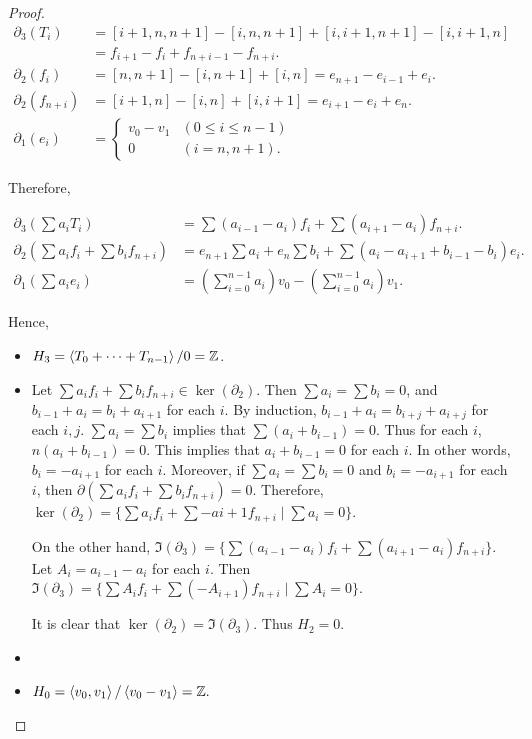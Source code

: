 \documentclass[12pt, psamsfonts]{amsart}
\theoremstyle{definition}
\theoremstyle{remark}
\numberwithin{equation}{section}
\begin{document}
\begin{proof}
  \begin{align*}
    \partial_3(T_i)
      &= [i + 1, n, n + 1] - [i, n, n + 1] + [i, i + 1, n + 1] - [i, i + 1, n] \\
      &= f_{i + 1} - f_i + f_{n + i - 1} - f_{n + i}. \\
    \partial_2(f_i)
      &= [n, n + 1] - [i, n + 1] + [i, n] = e_{n + 1} - e_{i - 1} + e_i. \\
    \partial_2(f_{n + i})
      &= [i + 1, n] - [i, n] + [i, i + 1] = e_{i + 1} - e_{i} + e_n. \\
    \partial_1(e_i) &= \begin{cases}
      v_0 - v_1 & (0 \leq i \leq n - 1) \\
      0 & (i = n, n + 1).
    \end{cases} 
  \end{align*}

  Therefore,

  \begin{align*}
    \partial_3(\sum a_iT_i) &= \sum (a_{i - 1} - a_i)f_i + \sum (a_{i + 1} - a_i) f_{n + i}. \\
    \partial_2(\sum a_if_i + \sum b_if_{n + i}) &= e_{n + 1}\sum a_i + e_n\sum b_i + \sum (a_i - a_{i + 1} + b_{i - 1} - b_i) e_i.\\
    \partial_1(\sum a_i e_i) &= (\sum_{i=0}^{n-1} a_i) v_0 - (\sum_{i=0}^{n-1} a_i) v_1.
  \end{align*}

  Hence,

  \begin{itemize}
    \item
      $H_3 = \ev{ T_0 + \cdots + T_{n - 1} } / 0 = \mathbb{Z}$.
    \item
      Let $\sum a_if_i + \sum b_if_{n + i} \in \ker(\partial_2)$.
      Then $\sum a_i = \sum b_i = 0$, and $b_{i - 1} + a_i = b_i + a_{i + 1}$ for each $i$.
      By induction, $b_{i - 1} + a_i = b_{i + j} + a_{i + j}$ for each $i, j$.
      $\sum a_i = \sum b_i$ implies that $\sum (a_i + b_{i - 1}) = 0$.
      Thus for each $i$, $n(a_i + b_{i - 1}) = 0$.
      This implies that $a_i + b_{i - 1} = 0$ for each $i$.
      In other words, $b_i = -a_{i + 1}$ for each $i$.
      Moreover, if $\sum a_i = \sum b_i = 0$ and $b_i = -a_{i + 1}$ for each $i$, then $\partial(\sum a_if_i + \sum b_if_{n + i}) = 0$.
      Therefore, $\ker(\partial_2) = \{ \sum a_if_i + \sum -a{i + 1}f_{n + i} \mid \sum a_i = 0 \}$.

      On the other hand, $\Im(\partial_3) = \{ \sum (a_{i - 1} - a_i) f_i + \sum (a_{i + 1} - a_i) f_{n + i} \}$.
      Let $A_i = a_{i - 1} - a_i$ for each $i$.
      Then $\Im(\partial_3) = \{ \sum A_if_i + \sum (-A_{i + 1})f_{n + i} \mid \sum A_i = 0 \}$.

      It is clear that $\ker(\partial_2) = \Im(\partial_3)$.
      Thus $H_2 = 0$.
    \item
    \item
      $H_0 = \ev{ v_0, v_1 } / \ev{ v_0 - v_1 } = \mathbb{Z}.$
  \end{itemize}
\end{proof}
\end{document}

